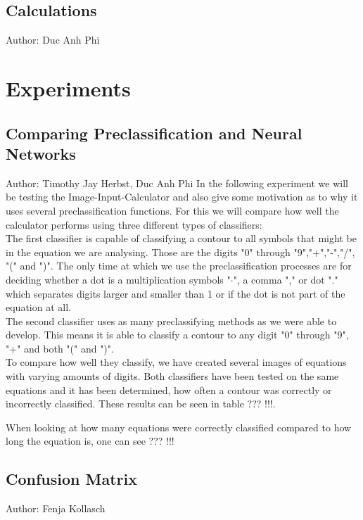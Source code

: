 \documentclass[12pt]{article}
\begin{document}
	\subsection{Calculations}
	\small{Author: Duc Anh Phi} \newline \newline
	
	\section{Experiments}
	\subsection{Comparing Preclassification and Neural Networks}
	\small{Author: Timothy Jay Herbst, Duc Anh Phi} \newline \newline
	In the following experiment we will be testing the Image-Input-Calculator and also give some motivation as to why it uses several preclassification functions.
	For this we will compare how well the calculator performs using three different types of classifiers:\\
	The first classifier is capable of classifying a contour to all symbols that might be in the equation we are analysing.
	Those are the digits "0" through "9","+","-","/", "(" and ")".
	The only time at which we use the preclassification processes are for deciding whether a dot is a multiplication symbols "$\cdot$", a comma "," or dot "." which separates digits larger and smaller than 1 or if the dot is not part of the equation at all.\\
	The second classifier uses as many preclassifying methods as we were able to develop.
	This means it is able to classify a contour to any digit "0" through "9", "+" and both "(" and ")".\\ %
	To compare how well they classify, we have created several images of equations with varying amounts of digits.
	Both classifiers have been tested on the same equations and it has been determined, how often a contour was correctly or incorrectly classified.
	These results can be seen in table ??? !!!.
	
	
	
	When looking at how many equations were correctly classified compared to how long the equation is, one can see ??? !!!
	
	
	
	
	\subsection{Confusion Matrix}
	\small{Author: Fenja Kollasch} \newline \newline
	
\end{document}
